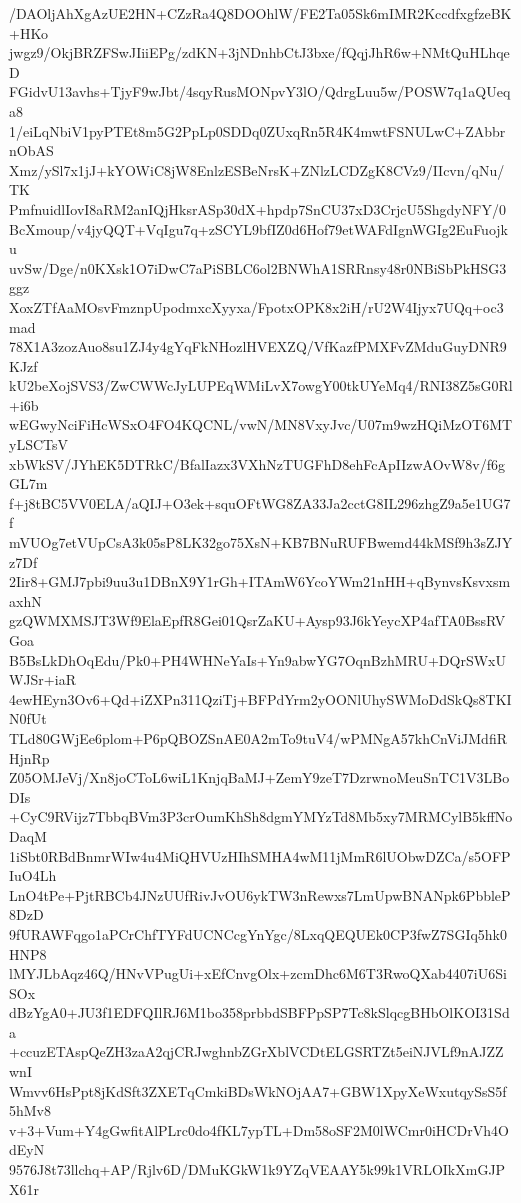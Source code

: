 /DAOljAhXgAzUE2HN+CZzRa4Q8DOOhlW/FE2Ta05Sk6mIMR2KccdfxgfzeBK+HKo
jwgz9/OkjBRZFSwJIiiEPg/zdKN+3jNDnhbCtJ3bxe/fQqjJhR6w+NMtQuHLhqeD
FGidvU13avhs+TjyF9wJbt/4sqyRusMONpvY3lO/QdrgLuu5w/POSW7q1aQUeqa8
1/eiLqNbiV1pyPTEt8m5G2PpLp0SDDq0ZUxqRn5R4K4mwtFSNULwC+ZAbbrnObAS
Xmz/ySl7x1jJ+kYOWiC8jW8EnlzESBeNrsK+ZNlzLCDZgK8CVz9/IIcvn/qNu/TK
PmfnuidlIovI8aRM2anIQjHksrASp30dX+hpdp7SnCU37xD3CrjcU5ShgdyNFY/0
BcXmoup/v4jyQQT+VqIgu7q+zSCYL9bfIZ0d6Hof79etWAFdIgnWGIg2EuFuojku
uvSw/Dge/n0KXsk1O7iDwC7aPiSBLC6ol2BNWhA1SRRnsy48r0NBiSbPkHSG3ggz
XoxZTfAaMOsvFmznpUpodmxcXyyxa/FpotxOPK8x2iH/rU2W4Ijyx7UQq+oc3mad
78X1A3zozAuo8su1ZJ4y4gYqFkNHozlHVEXZQ/VfKazfPMXFvZMduGuyDNR9KJzf
kU2beXojSVS3/ZwCWWcJyLUPEqWMiLvX7owgY00tkUYeMq4/RNI38Z5sG0Rl+i6b
wEGwyNciFiHcWSxO4FO4KQCNL/vwN/MN8VxyJvc/U07m9wzHQiMzOT6MTyLSCTsV
xbWkSV/JYhEK5DTRkC/BfalIazx3VXhNzTUGFhD8ehFcApIIzwAOvW8v/f6gGL7m
f+j8tBC5VV0ELA/aQIJ+O3ek+squOFtWG8ZA33Ja2cctG8IL296zhgZ9a5e1UG7f
mVUOg7etVUpCsA3k05sP8LK32go75XsN+KB7BNuRUFBwemd44kMSf9h3sZJYz7Df
2Iir8+GMJ7pbi9uu3u1DBnX9Y1rGh+ITAmW6YcoYWm21nHH+qBynvsKsvxsmaxhN
gzQWMXMSJT3Wf9ElaEpfR8Gei01QsrZaKU+Aysp93J6kYeycXP4afTA0BssRVGoa
B5BsLkDhOqEdu/Pk0+PH4WHNeYaIs+Yn9abwYG7OqnBzhMRU+DQrSWxUWJSr+iaR
4ewHEyn3Ov6+Qd+iZXPn311QziTj+BFPdYrm2yOONlUhySWMoDdSkQs8TKIN0fUt
TLd80GWjEe6plom+P6pQBOZSnAE0A2mTo9tuV4/wPMNgA57khCnViJMdfiRHjnRp
Z05OMJeVj/Xn8joCToL6wiL1KnjqBaMJ+ZemY9zeT7DzrwnoMeuSnTC1V3LBoDIs
+CyC9RVijz7TbbqBVm3P3crOumKhSh8dgmYMYzTd8Mb5xy7MRMCylB5kffNoDaqM
1iSbt0RBdBnmrWIw4u4MiQHVUzHIhSMHA4wM11jMmR6lUObwDZCa/s5OFPIuO4Lh
LnO4tPe+PjtRBCb4JNzUUfRivJvOU6ykTW3nRewxs7LmUpwBNANpk6PbbleP8DzD
9fURAWFqgo1aPCrChfTYFdUCNCcgYnYgc/8LxqQEQUEk0CP3fwZ7SGIq5hk0HNP8
lMYJLbAqz46Q/HNvVPugUi+xEfCnvgOlx+zcmDhc6M6T3RwoQXab4407iU6SiSOx
dBzYgA0+JU3f1EDFQIlRJ6M1bo358prbbdSBFPpSP7Tc8kSlqcgBHbOlKOI31Sda
+ccuzETAspQeZH3zaA2qjCRJwghnbZGrXblVCDtELGSRTZt5eiNJVLf9nAJZZwnI
Wmvv6HsPpt8jKdSft3ZXETqCmkiBDsWkNOjAA7+GBW1XpyXeWxutqySsS5f5hMv8
v+3+Vum+Y4gGwfitAlPLrc0do4fKL7ypTL+Dm58oSF2M0lWCmr0iHCDrVh4OdEyN
9576J8t73llchq+AP/Rjlv6D/DMuKGkW1k9YZqVEAAY5k99k1VRLOIkXmGJPX61r
